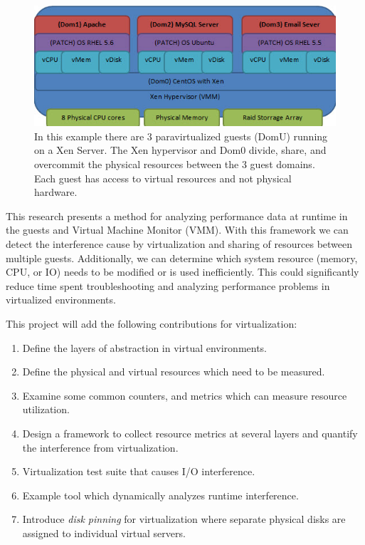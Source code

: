 \begin{figure}[!h]
  \begin{center}
  \includegraphics[width=6in]{images/VirtualizationExample.jpg}
  \caption{In this example there are 3 paravirtualized guests (DomU) running on a Xen Server.  The Xen hypervisor and Dom0 divide, share, and overcommit the physical resources between the 3 guest domains.  Each guest has access to virtual resources and not physical hardware.}
  \label{virtStack}
  \end{center}
\end{figure}

\indent This research presents a method for analyzing performance data at runtime in the guests and Virtual Machine Monitor (VMM).   With this framework we can detect the interference cause by virtualization and sharing of resources between multiple guests.  Additionally, we can determine which system resource (memory, CPU, or IO) needs to be modified or is used inefficiently.  This could significantly reduce time spent troubleshooting and analyzing performance problems in virtualized environments.

\indent This project will add the following contributions for virtualization:
\begin{enumerate}
\item Define the layers of abstraction in virtual environments.
\item Define the physical and virtual resources which need to be measured.
\item Examine some common counters, and metrics which can measure resource utilization.
\item Design a framework to collect resource metrics at several layers and quantify the interference from virtualization.
\item Virtualization test suite that causes I/O interference.
\item Example tool which dynamically analyzes runtime interference.
\item Introduce \emph{disk pinning} for virtualization where separate physical disks are assigned to individual virtual servers.
\end{enumerate}

